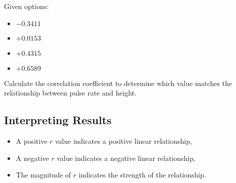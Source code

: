 \documentclass{article}
\begin{document}
Given options:
\begin{itemize}
    \item \(-0.3411\)
    \item \(+0.0153\)
    \item \(+0.4315\)
    \item \(+0.6589\)
\end{itemize}

Calculate the correlation coefficient to determine which value matches the relationship between pulse rate and height.

\subsection{Interpreting Results}
\begin{itemize}
    \item A positive \( r \) value indicates a positive linear relationship,
    \item A negative \( r \) value indicates a negative linear relationship,
    \item The magnitude of \( r \) indicates the strength of the relationship.
\end{itemize}
\end{document}
